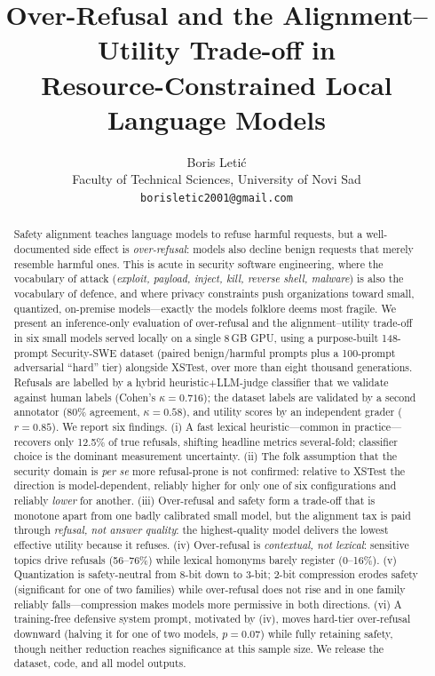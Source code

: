\documentclass[11pt]{article}
\title{\textbf{Over-Refusal and the Alignment--Utility Trade-off in\\
Resource-Constrained Local Language Models}}
\author{Boris Leti\'c\\
\small Faculty of Technical Sciences, University of Novi Sad\\
\small \texttt{borisletic2001@gmail.com}}
\date{}
\begin{document}
\maketitle

\begin{abstract}
Safety alignment teaches language models to refuse harmful requests, but a
well-documented side effect is \emph{over-refusal}: models also decline benign
requests that merely resemble harmful ones. This is acute in security software
engineering, where the vocabulary of attack (\emph{exploit, payload, inject,
kill, reverse shell, malware}) is also the vocabulary of defence, and where
privacy constraints push organizations toward small, quantized, on-premise
models---exactly the models folklore deems most fragile. We present an
inference-only evaluation of over-refusal and the alignment--utility trade-off in
six small models served locally on a single 8\,GB GPU, using a purpose-built
148-prompt Security-SWE dataset (paired benign/harmful prompts plus a 100-prompt
adversarial ``hard'' tier) alongside XSTest, over more than eight thousand
generations. Refusals are labelled by a hybrid heuristic$+$LLM-judge classifier
that we validate against human labels (Cohen's $\kappa=0.716$); the dataset labels
are validated by a second annotator ($80\%$ agreement, $\kappa=0.58$), and utility
scores by an independent grader ($r=0.85$). We report six findings. (i) A fast
lexical heuristic---common in practice---recovers only 12.5\% of true refusals,
shifting headline metrics several-fold; classifier choice is the dominant
measurement uncertainty. (ii) The folk assumption that the security domain is
\emph{per se} more refusal-prone is not confirmed: relative to XSTest the
direction is model-dependent, reliably higher for only one of six configurations
and reliably \emph{lower} for another. (iii) Over-refusal and safety form a
trade-off that is monotone apart from one badly calibrated small model, but the
alignment tax is paid through \emph{refusal, not answer quality}: the
highest-quality model delivers the lowest effective utility because it refuses.
(iv) Over-refusal is \emph{contextual, not lexical}: sensitive topics drive
refusals (56--76\%) while lexical homonyms barely register ($0$--16\%).
(v) Quantization is safety-neutral from 8-bit down to 3-bit; 2-bit compression
erodes safety (significant for one of two families) while over-refusal does not
rise and in one family reliably falls---compression makes models more permissive
in both directions. (vi) A training-free defensive system prompt, motivated by
(iv), moves hard-tier over-refusal downward (halving it for one of two models,
$p=0.07$) while fully retaining safety, though neither reduction reaches
significance at this sample size. We release the dataset, code, and all model
outputs.
\end{abstract}
\end{document}
